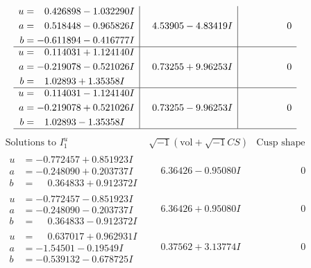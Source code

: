 \documentclass[1p]{elsarticle_modified}
\theoremstyle{definition}
\newcommand{\I}{\sqrt{-1}}
\begin{document}
$$\begin{array}{c|c|c}
\begin{aligned}
u &= \phantom{-}0.426898 - 1.032290 I \\
a &= \phantom{-}0.518448 - 0.965826 I \\
b &= -0.611894 - 0.416777 I\end{aligned}
 & \phantom{-}4.53905 - 4.83419 I & \phantom{-0.000000 } 0 \\ \hline\begin{aligned}
u &= \phantom{-}0.114031 + 1.124140 I \\
a &= -0.219078 - 0.521026 I \\
b &= \phantom{-}1.02893 + 1.35358 I\end{aligned}
 & \phantom{-}0.73255 + 9.96253 I & \phantom{-0.000000 } 0 \\ \hline\begin{aligned}
u &= \phantom{-}0.114031 - 1.124140 I \\
a &= -0.219078 + 0.521026 I \\
b &= \phantom{-}1.02893 - 1.35358 I\end{aligned}
 & \phantom{-}0.73255 - 9.96253 I & \phantom{-0.000000 } 0\\
 \hline 
 \end{array}$$\newpage$$\begin{array}{c|c|c}  
\text{Solutions to }I^u_{1}& \I (\text{vol} + \sqrt{-1}CS) & \text{Cusp shape}\\
 \hline 
\begin{aligned}
u &= -0.772457 + 0.851923 I \\
a &= -0.248090 + 0.203737 I \\
b &= \phantom{-}0.364833 + 0.912372 I\end{aligned}
 & \phantom{-}6.36426 - 0.95080 I & \phantom{-0.000000 } 0 \\ \hline\begin{aligned}
u &= -0.772457 - 0.851923 I \\
a &= -0.248090 - 0.203737 I \\
b &= \phantom{-}0.364833 - 0.912372 I\end{aligned}
 & \phantom{-}6.36426 + 0.95080 I & \phantom{-0.000000 } 0 \\ \hline\begin{aligned}
u &= \phantom{-}0.637017 + 0.962931 I \\
a &= -1.54501 - 0.19549 I \\
b &= -0.539132 - 0.678725 I\end{aligned}
 & \phantom{-}0.37562 + 3.13774 I & \phantom{-0.000000 } 0 \\ \hline\begin{aligned}

\end{aligned}
\end{array}$$
\end{document}
